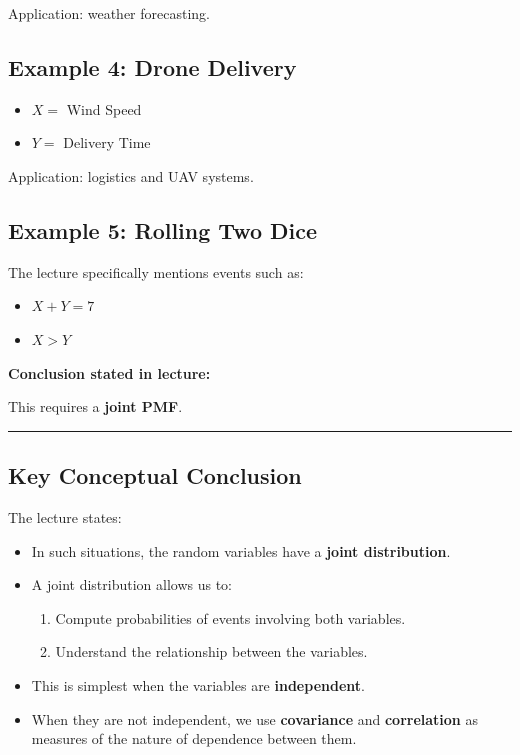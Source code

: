 \documentclass[12pt]{article}
\begin{document}
Application: weather forecasting.

\subsection*{Example 4: Drone Delivery}

\begin{itemize}
    \item \(X =\) Wind Speed
    \item \(Y =\) Delivery Time
\end{itemize}

Application: logistics and UAV systems.

\subsection*{Example 5: Rolling Two Dice}

The lecture specifically mentions events such as:

\begin{itemize}
    \item \(X+Y=7\)
    \item \(X>Y\)
\end{itemize}

\noindent \textbf{Conclusion stated in lecture:}

This requires a \textbf{joint PMF}.

\hrule
\vspace{1em}

\subsection*{Key Conceptual Conclusion}

The lecture states:

\begin{itemize}
    \item In such situations, the random variables have a \textbf{joint distribution}.
    \item A joint distribution allows us to:
    \begin{enumerate}
        \item Compute probabilities of events involving both variables.
        \item Understand the relationship between the variables.
    \end{enumerate}
    \item This is simplest when the variables are \textbf{independent}.
    \item When they are not independent, we use \textbf{covariance} and \textbf{correlation} as measures of the nature of dependence between them.
\end{itemize}
\end{document}
